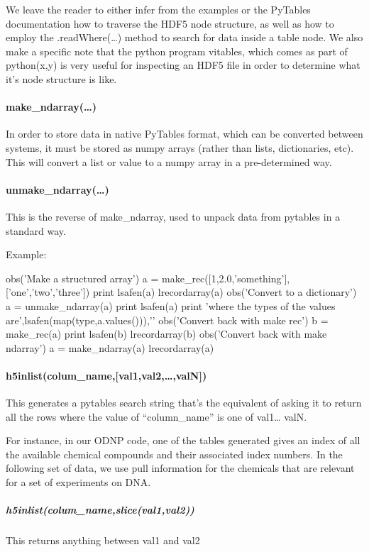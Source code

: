 We leave the reader to either infer from the examples or the
    PyTables documentation how to traverse the HDF5 node
    structure, as well as how to employ the .readWhere(\ldots)
    method to search for data inside a table node.
We also make a specific note that the python program vitables,
    which comes as part of python(x,y) is very useful for
    inspecting an HDF5 file in order to determine what it's node
    structure is like.
\paragraph{make\_ndarray(\ldots)}
In order to store data in native PyTables format,
    which can be converted between systems,
    it must be stored as numpy arrays (rather than lists,
    dictionaries, etc).
This will convert a list or value to a numpy array
    in a pre-determined way.
\paragraph{unmake\_ndarray(\ldots)}
This is the reverse of make\_ndarray,
    used to unpack data from pytables in a standard way.

Example:
\begin{python}
obs('Make a structured array\n')
a = make_rec([1,2.0,'something'],['one','two','three'])
print lsafen(a)
lrecordarray(a)
obs('Convert to a dictionary\n')
a = unmake_ndarray(a)
print lsafen(a)
print 'where the types of the values are',lsafen(map(type,a.values())),'\n\n'
obs('Convert back with make rec\n')
b = make_rec(a)
print lsafen(b)
lrecordarray(b)
obs('Convert back with make ndarray\n')
a = make_ndarray(a)
lrecordarray(a)
\end{python}
\paragraph{h5inlist(colum\_name,[val1,val2,\ldots,valN])}
This generates a pytables search string
    that's the equivalent of asking it to return all the rows
    where the value of ``column\_name'' is one of val1\ldots
    valN.

For instance,
    in our ODNP code,
    one of the tables generated gives an index of all the
    available chemical compounds and their associated index
    numbers.
In the following set of data, we use pull information for the
    chemicals that are
    relevant for a set of experiments on DNA.

\subparagraph{h5inlist(colum\_name,slice(val1,val2))}
This returns anything between val1 and val2

